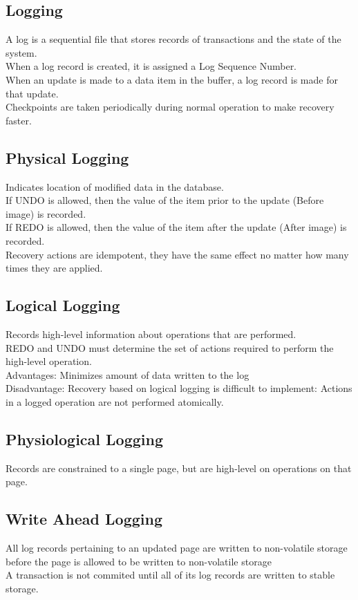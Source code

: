 \subsection{Logging}
A log is a sequential file that stores records of transactions and the state of the system.\\
When a log record is created, it is assigned a Log Sequence Number. \\
When an update is made to a data item in the buffer, a log record is made for that update.\\
Checkpoints are taken periodically during normal operation to make recovery faster.
\subsection{Physical Logging}
Indicates location of modified data in the database. \\
If UNDO is allowed, then the value of the item prior to the update (Before image) is recorded.\\
If REDO is allowed, then the value of the item after the update (After image) is recorded. \\
Recovery actions are idempotent, they have the same effect no matter how many times they are applied.
\subsection{Logical Logging}
Records high-level information about operations that are performed.\\
REDO and UNDO must determine the set of actions required to perform the high-level operation.\\
Advantages: Minimizes amount of data written to the log \\
Disadvantage: Recovery based on logical logging is difficult to implement: Actions in a logged operation are not performed atomically.
\subsection{Physiological Logging}
Records are constrained to a single page, but are high-level on operations on that page.
\subsection{Write Ahead Logging}
All log records pertaining to an updated page are written to non-volatile storage before the page is allowed to be written to non-volatile storage\\
A transaction is not commited until all of its log records are written to stable storage.
